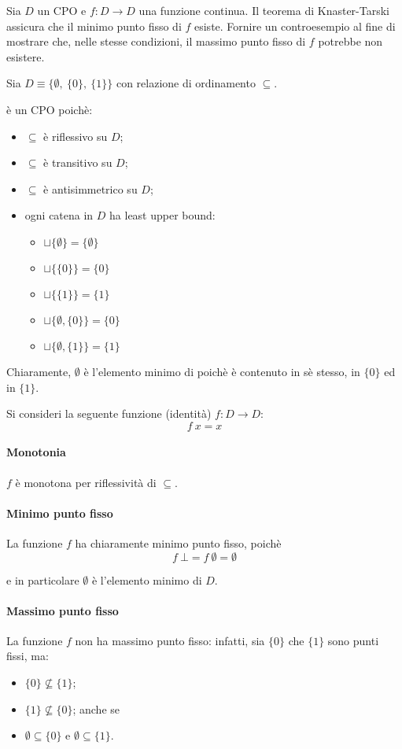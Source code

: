 \newcommand{\lt}{\ensuremath{\sqsubseteq}}

{
  Sia $D$ un CPO e $f: D \to D$ una funzione continua. Il teorema di
  Knaster-Tarski assicura che il minimo punto fisso di $f$ esiste.
  Fornire un controesempio al fine di mostrare che, nelle stesse condizioni, il
  massimo punto fisso di $f$ potrebbe non esistere.
}
{
}

Sia $D \equiv \{\emptyset,\ \{0\},\ \{1\}\}$ con relazione di ordinamento
$\subseteq$.

 è un CPO poichè:
\begin{itemize}
  \item $\subseteq$ è riflessivo su $D$;
  \item $\subseteq$ è transitivo su $D$;
  \item $\subseteq$ è antisimmetrico su $D$;
  \item ogni catena in $D$ ha least upper bound:
  \begin{itemize}
    \item $\sqcup\{\emptyset\} = \{\emptyset\}$
    \item $\sqcup\{\{0\}\} = \{0\}$
    \item $\sqcup\{\{1\}\} = \{1\}$
    \item $\sqcup\{\emptyset, \{0\}\} = \{0\}$
    \item $\sqcup\{\emptyset, \{1\}\} = \{1\}$
  \end{itemize}
\end{itemize}

Chiaramente, $\emptyset$ è l'elemento minimo di  poichè
è contenuto in sè stesso, in $\{0\}$ ed in $\{1\}$.

Si consideri la seguente funzione (identità) $f: D \to D$:
$$
f\ x = x
$$

\paragraph{Monotonia} $f$ è monotona per riflessività di $\subseteq$.

\paragraph{Minimo punto fisso}
La funzione $f$ ha chiaramente minimo punto fisso, poichè
$$
f\ \bot = f\ \emptyset = \emptyset
$$

e in particolare $\emptyset$ è l'elemento minimo di $D$.

\paragraph{Massimo punto fisso}
La funzione $f$ non ha massimo punto fisso: infatti, sia $\{0\}$ che $\{1\}$
sono punti fissi, ma:
\begin{itemize}
  \item $\{0\} \not\subseteq \{1\}$;
  \item $\{1\} \not\subseteq \{0\}$; anche se
  \item $\emptyset \subseteq \{0\}$ e $\emptyset \subseteq \{1\}$.
\end{itemize}

\let\lt\undefined
